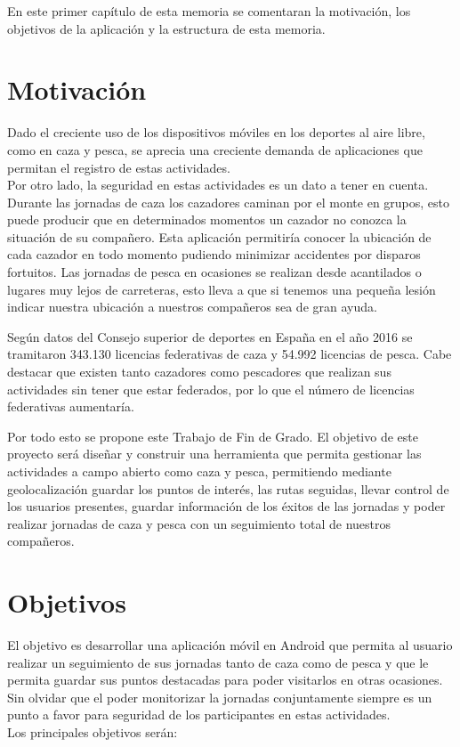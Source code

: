 En este primer capítulo de esta memoria se comentaran la motivación, los objetivos de la aplicación y la estructura de esta memoria. 
\section{Motivación}
Dado el creciente uso de los dispositivos móviles en los deportes al aire libre, como en caza y pesca, se aprecia una creciente demanda de aplicaciones que permitan el registro de estas actividades.\\
Por otro lado, la seguridad en estas actividades es un dato a tener en cuenta. Durante las jornadas de caza los cazadores caminan por el monte en grupos, esto puede producir que en determinados momentos un cazador no conozca la situación de su compañero.
Esta aplicación permitiría conocer la ubicación de cada cazador en todo momento pudiendo minimizar accidentes por disparos fortuitos. Las jornadas de pesca en ocasiones  se realizan desde acantilados o lugares muy lejos de carreteras, esto lleva a que si tenemos una pequeña lesión indicar nuestra ubicación a nuestros compañeros sea de gran ayuda.

Según datos del Consejo superior de deportes en España en el año 2016 se tramitaron 343.130 licencias federativas de caza y 54.992 licencias de pesca. Cabe destacar que existen tanto cazadores como pescadores que realizan sus actividades sin tener que estar federados, por lo que el número de licencias federativas aumentaría.





Por todo esto se propone este Trabajo de Fin de Grado.
El objetivo de este proyecto será diseñar y construir una herramienta que permita gestionar las actividades a campo abierto como
caza y pesca, permitiendo mediante geolocalización guardar los puntos de interés, las rutas seguidas,
llevar control de los usuarios presentes, guardar información de los éxitos de las jornadas y poder realizar jornadas de caza y pesca con un seguimiento  total de nuestros compañeros.


\section{Objetivos}
El objetivo es desarrollar una aplicación móvil en Android que permita al usuario realizar un seguimiento de sus jornadas tanto de caza como de pesca  y que le permita guardar sus puntos destacadas para poder visitarlos en otras ocasiones. Sin olvidar que el poder monitorizar la jornadas conjuntamente siempre es un punto a favor para seguridad de los participantes en estas actividades.\\ Los principales objetivos serán:

